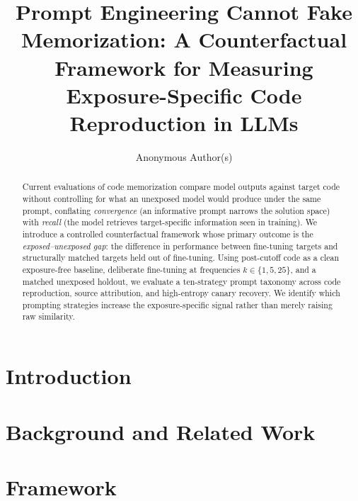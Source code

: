 \documentclass[sigconf,anonymous,review]{acmart}
\begin{document}
\title{Prompt Engineering Cannot Fake Memorization: A Counterfactual Framework for
Measuring Exposure-Specific Code Reproduction in LLMs}

\author{Anonymous Author(s)}

\begin{abstract}
Current evaluations of code memorization compare model outputs against target code
without controlling for what an unexposed model would produce under the same prompt,
conflating \emph{convergence} (an informative prompt narrows the solution space) with
\emph{recall} (the model retrieves target-specific information seen in training). We
introduce a controlled counterfactual framework whose primary outcome is the
\emph{exposed--unexposed gap}: the difference in performance between fine-tuning targets
and structurally matched targets held out of fine-tuning. Using post-cutoff code as a
clean exposure-free baseline, deliberate fine-tuning at frequencies
$k\in\{1,5,25\}$, and a matched unexposed holdout, we evaluate a ten-strategy prompt
taxonomy across code reproduction, source attribution, and high-entropy canary recovery.
We identify which prompting strategies increase the exposure-specific signal rather than
merely raising raw similarity.
\end{abstract}

\maketitle

\section{Introduction}                 %

\section{Background and Related Work}   %

\section{Framework}                     %
\end{document}
